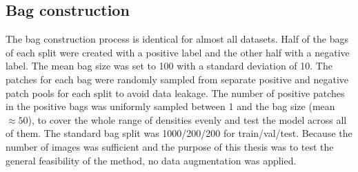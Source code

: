 \documentclass[12pt,parskip = half, DIV=classic,listof=totoc]{scrartcl}
\begin{document}
		
		\subsection{Bag construction}\label{sec:bag_construction}
			The bag construction process is identical for almost all datasets. Half of the bags of each split were created with a positive label and the other half with a negative label.
			The mean bag size was set to 100 with a standard deviation of 10. The patches for each bag were randomly sampled from separate positive and negative patch
			pools for each split to avoid data leakage. The number of positive patches in the positive bags was uniformly sampled between 1 and the bag size (mean $\approx 50$), 
			to cover the whole range of densities evenly and test the model across all of them.
			The standard bag split was 1000/200/200 for train/val/test.
			Because the number of images was sufficient and the purpose of this thesis was to test the general feasibility of the method, no data augmentation was applied.
			
\end{document}
